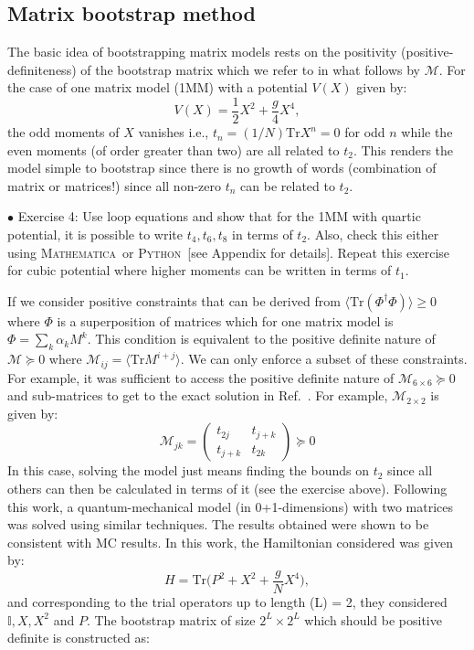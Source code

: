 \documentclass[letter,11pt]{article}
\newcommand{\MA}{\textsc{Mathematica}}
\newcommand{\PY}{\textsc{Python}}
\begin{document}
\subsection{Matrix bootstrap method}
The basic idea of bootstrapping matrix models rests on the 
positivity (positive-definiteness) of the bootstrap matrix which we refer to in what follows 
by $\mathcal{M}$. For the case of one matrix model (1MM) with a potential $V(X)$ given by: 
\begin{equation}
    V(X) = \frac12 X^2 + \frac{g}{4} X^4, 
\end{equation}
the odd moments of $X$ vanishes i.e., $ t_{n} = (1/N)\mbox{Tr} X^n = 0$ for odd $n$
while the even moments (of order greater than two) are all related to $t_{2}$. This renders the 
model simple to bootstrap since there is no growth of words (combination of matrix or matrices!)
since all non-zero $t_{n}$ can be related to $t_{2}$. 
\begin{mdframed}[backgroundcolor=blue!3] 
	$\bullet$ Exercise 4: Use loop equations and show that for the 1MM with quartic potential, it is possible to write $t_{4}, t_{6}, t_{8}$ in terms of $t_{2}$. Also, check this either using \MA~or  \PY~[see Appendix for details]. 
Repeat this exercise for cubic potential where higher moments can be written in terms of $t_1$.  
\end{mdframed} 
If we consider positive constraints that can be derived from $\langle \mbox{Tr}(\Phi^{\dagger}\Phi) \rangle \ge 0 $
where $\Phi$ is a superposition of matrices which for one matrix model is 
$ \Phi = \sum_{k} \alpha_{k} M^{k}$. This condition is equivalent to the positive definite nature of
$\mathcal{M} \succeq 0 $ where $ \mathcal{M}_{ij} = \langle \mbox{Tr} M^{i+j} \rangle$. 
We can only enforce a subset of these constraints. For example, it was sufficient to 
access the positive definite nature of $\mathcal{M}_{6 \times 6} \succeq 0 $ 
and sub-matrices to get to the exact solution in Ref.~\cite{Lin:2020mme}. 
For example, $\mathcal{M}_{2 \times 2}$ is given by:
\begin{equation}
	\mathcal{M}_{jk} = 
	\begin{pmatrix}
		t_{2j} & t_{j+k}  \\
		t_{j+k} & t_{2k}  
	\end{pmatrix}  \succeq 0
\end{equation}
In this case, solving the model just means finding the bounds on $t_{2}$ 
since all others can then be calculated in terms of it (see the exercise above). 
Following this work, a quantum-mechanical 
model (in 0+1-dimensions) with two matrices was solved using similar techniques. 
The results obtained were shown to be consistent with MC results. 
In this work, the Hamiltonian considered was given by:
\begin{equation}
H = \mbox{Tr} \Big( P^2 + X^2 + \frac{g}{N} X^4 \Big),
\end{equation}
and corresponding to the trial operators up to length (L) = 2, 
they considered $ \mathbb{I}, X, X^{2}$ and $P$. The bootstrap matrix
of size $2^L \times 2^L$ which should be positive definite is constructed as:
\end{document}

